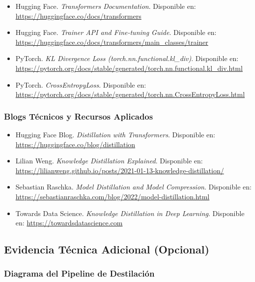 \documentclass[12pt]{article}
\begin{document}
	\begin{itemize}
		\item Hugging Face. \textit{Transformers Documentation}. Disponible en: \url{https://huggingface.co/docs/transformers}
		
		\item Hugging Face. \textit{Trainer API and Fine-tuning Guide}. Disponible en: \url{https://huggingface.co/docs/transformers/main_classes/trainer}
		
		\item PyTorch. \textit{KL Divergence Loss (torch.nn.functional.kl\_div)}. Disponible en: \url{https://pytorch.org/docs/stable/generated/torch.nn.functional.kl_div.html}
		
		\item PyTorch. \textit{CrossEntropyLoss}. Disponible en: \url{https://pytorch.org/docs/stable/generated/torch.nn.CrossEntropyLoss.html}
	\end{itemize}
	
	\subsubsection{Blogs Técnicos y Recursos Aplicados}
	
	\begin{itemize}
		\item Hugging Face Blog. \textit{Distillation with Transformers}. Disponible en: \url{https://huggingface.co/blog/distillation}
		
		\item Lilian Weng. \textit{Knowledge Distillation Explained}. Disponible en: \url{https://lilianweng.github.io/posts/2021-01-13-knowledge-distillation/}
		
		\item Sebastian Raschka. \textit{Model Distillation and Model Compression}. Disponible en: \url{https://sebastianraschka.com/blog/2022/model-distillation.html}
		
		\item Towards Data Science. \textit{Knowledge Distillation in Deep Learning}. Disponible en: \url{https://towardsdatascience.com}
	\end{itemize}
	
	\subsection{Evidencia Técnica Adicional (Opcional)}
	
	\subsubsection{Diagrama del Pipeline de Destilación}
	
\end{document}
